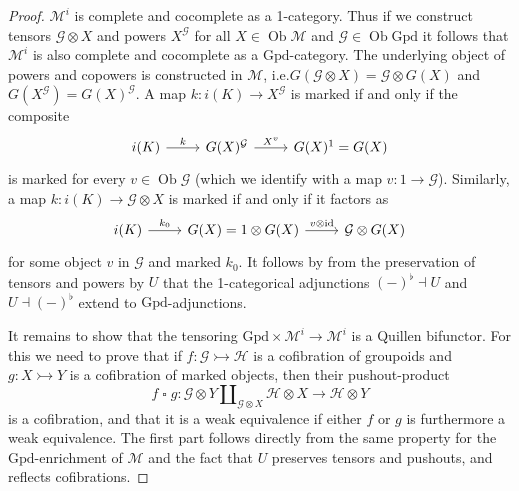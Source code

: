 \documentclass[a4paper]{article}
\theoremstyle{remark}
\theoremstyle{definition}
\begin{document}
\begin{proof}
  $\mathcal{M}^i$ is complete and cocomplete as a 1-category.
  Thus if we construct tensors $\mathcal{G} \otimes X$ and powers $X^\mathcal{G}$ for all $X \in \operatorname{Ob} \mathcal{M}$ and $\mathcal{G} \in \operatorname{Ob} \mathrm{Gpd}$ it follows that $\mathcal{M}^i$ is also complete and cocomplete as a $\mathrm{Gpd}$-category.
  The underlying object of powers and copowers is constructed in $\mathcal{M}$, i.e.\@ $G(\mathcal{G} \otimes X) = \mathcal{G} \otimes G(X)$ and $G(X^\mathcal{G}) = G(X)^\mathcal{G}$.
  A map $k : i(K) \rightarrow X^\mathcal{G}$ is marked if and only if the composite
  \begin{equation}
    \begin{tikzcd}
      i(K) \arrow[r, "k"] & G(X)^\mathcal{G} \arrow[r, "X^v"] & G(X)^1 = G(X)
    \end{tikzcd}
  \end{equation}
  is marked for every $v \in \operatorname{Ob} \mathcal{G}$ (which we identify with a map $v : 1 \rightarrow \mathcal{G}$).
  Similarly, a map $k : i(K) \rightarrow \mathcal{G} \otimes X$ is marked if and only if it factors as
  \begin{equation}
    \begin{tikzcd}
      i(K) \arrow[r, "k_0"] & G(X) = 1 \otimes G(X) \arrow[r, "v \mathbin{\otimes} \mathrm{id}"] & \mathcal{G} \otimes G(X)
    \end{tikzcd}
  \end{equation}
  for some object $v$ in $\mathcal{G}$ and marked $k_0$.
  It follows by \cite[Theorem 4.85]{basic-concepts-of-enriched-category-theory} from the preservation of tensors and powers by $U$ that the 1-categorical adjunctions $(-)^\flat \dashv U$ and $U \dashv (-)^\flat$ extend to $\mathrm{Gpd}$-adjunctions.

  It remains to show that the tensoring $\mathrm{Gpd} \times \mathcal{M}^i \rightarrow \mathcal{M}^i$ is a Quillen bifunctor.
  For this we need to prove that if $f : \mathcal{G} \rightarrowtail \mathcal{H}$ is a cofibration of groupoids and $g : X \rightarrowtail Y$ is a cofibration of marked objects, then their pushout-product
  \begin{equation}
    f \mathbin{\square} g : \mathcal{G} \otimes Y \amalg_{\mathcal{G} \otimes X} \mathcal{H} \otimes X \rightarrow \mathcal{H} \otimes Y
  \end{equation}
  is a cofibration, and that it is a weak equivalence if either $f$ or $g$ is furthermore a weak equivalence.
  The first part follows directly from the same property for the $\mathrm{Gpd}$-enrichment of $\mathcal{M}$ and the fact that $U$ preserves tensors and pushouts, and reflects cofibrations.


\end{proof}
\end{document}
